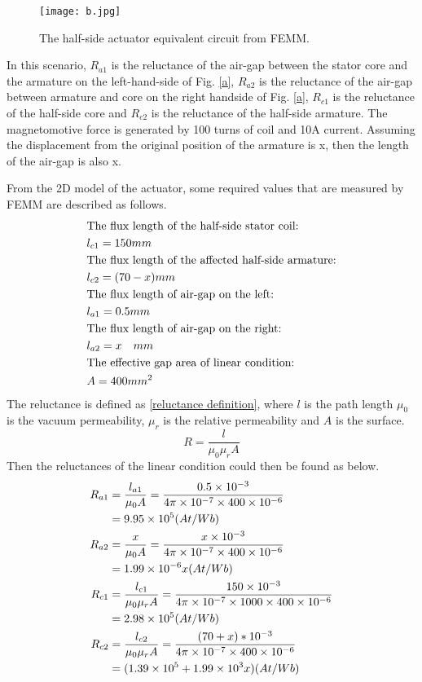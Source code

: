 \documentclass[a4paper]{IEEEtran}
\begin{document}
\begin{figure}[H]
\begin{centering}
\texttt{[image: b.jpg]}
\par\end{centering}   
\caption{The half-side actuator equivalent circuit from FEMM.\label{b}}
\end{figure}   
In this scenario, $ R_{a1} $ is the reluctance of the air-gap between the stator core and the armature on the left-hand-side of Fig. \ref{a}, 
$ R_{a2} $ is the reluctance of  the air-gap between armature and core on the right handside of Fig. \ref{a}, 
$ R_{c1} $ is the reluctance of the half-side core and $ R_{c2} $ is the reluctance of the half-side armature. 
The magnetomotive force is generated by 100 turns of coil and 10A current.
Assuming the displacement from the original position of the armature is x, then the length of the air-gap is also x.\par 
From the 2D model of the actuator, some required values that are measured by FEMM are described as follows.
\begin{align}
	&\text {The flux length of the half-side stator coil:}\notag \\ 
	&l_{c1} = 150mm\\
	&\text {The flux length of the affected half-side armature:}\notag \\
	&l_{c2} = (70 - x) mm\\
	&\text{The flux length of air-gap on the left:}\notag\\
	&l_{a1} = 0.5mm\\
	&\text{The flux length of air-gap on the right:}\notag\\
	&l_{a2} = x\quad mm\\
	&\text{The effective gap area of linear condition:}\notag\\
	&A = 400 mm^2
\end{align}
The reluctance is defined as \eqref{reluctance definition}, where $l$ is the path length
$\mu_0$ is the vacuum permeability, $\mu_r$ is the relative permeability and $A$ is the surface.
\begin{equation}
  R = \frac{l}{\mu_0 \mu_r A}\label{reluctance definition}
\end{equation} 
Then the reluctances of the linear condition could then be found as below.
\begin{align}
	R_{a1} &= \frac{l_{a1}}{\mu_0 A} = \frac{0.5\times10^{-3}}{4\pi\times10^{-7}\times 400\times 10^{-6}}\notag\\ &= 9.95\times10^{5}(At/Wb)\\
	R_{a2} &= \frac{x}{\mu_0 A} = \frac{x\times 10^{-3}}{4\pi\times 10^{-7}\times 400\times 10^{-6}}\notag\\ &= 1.99\times 10^{-6}x(At/Wb)\\
	R_{c1} &= \frac{l_{c1}}{\mu_0\mu_rA} = \frac{150\times10^{-3}}{4\pi\times 10^{-7}\times 1000\times 400\times 10^{-6}}\notag\\ &= 2.98\times 10^{5} (At/Wb)\\
	R_{c2} &= \frac{l_{c2}}{\mu_0\mu_rA} = \frac{(70 + x) *10^{-3}}{4\pi\times10^{-7}\times 400\times 10^{-6}}\notag\\ &= (1.39\times 10^5 + 1.99\times 10^3x)(At/Wb)
\end{align}
\end{document}
